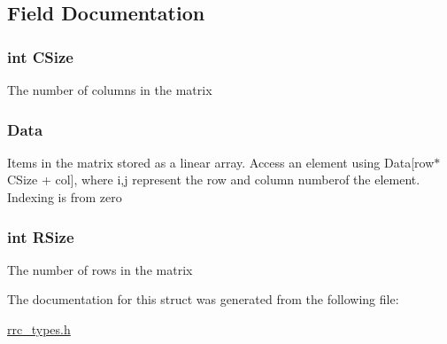 \subsection{Field Documentation}
\hypertarget{struct_r_r_complex_matrix_a17c9a5894aa9cb3789346dcaa9c370bb}{
\subsubsection[{C\+Size}]{\setlength{\rightskip}{0pt plus 5cm}int C\+Size}}\label{struct_r_r_complex_matrix_a17c9a5894aa9cb3789346dcaa9c370bb}
The number of columns in the matrix \hypertarget{struct_r_r_complex_matrix_a2853286fc6b37960bba4c8871da839fa}{
\subsubsection[{Data}]{ Data}}\label{struct_r_r_complex_matrix_a2853286fc6b37960bba4c8871da839fa}
Items in the matrix stored as a linear array. Access an element using Data\mbox{[}row$\ast$\+C\+Size + col\mbox{]}, where i,j represent the row and column numberof the element. Indexing is from zero \hypertarget{struct_r_r_complex_matrix_a4d8512c879223c0e0d1522dae38e7819}{
\subsubsection[{R\+Size}]{\setlength{\rightskip}{0pt plus 5cm}int R\+Size}}\label{struct_r_r_complex_matrix_a4d8512c879223c0e0d1522dae38e7819}
The number of rows in the matrix 

The documentation for this struct was generated from the following file\+:\begin{DoxyCompactItemize}
\item 
\hyperlink{rrc__types_8h}{rrc\+\_\+types.\+h}\end{DoxyCompactItemize}

